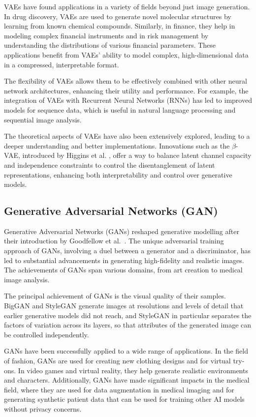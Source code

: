 VAEs have found applications in a variety of fields beyond just image generation. In drug discovery,
VAEs are used to generate novel molecular structures by learning from known chemical compounds.
Similarly, in finance, they help in modeling complex financial instruments and in risk management by
understanding the distributions of various financial parameters. These applications benefit from
VAEs' ability to model complex, high-dimensional data in a compressed, interpretable format.

The flexibility of VAEs allows them to be effectively combined with other neural network
architectures, enhancing their utility and performance. For example, the integration of VAEs with
Recurrent Neural Networks (RNNs) has led to improved models for sequence data, which is useful in
natural language processing and sequential image analysis.

The theoretical aspects of VAEs have also been extensively explored, leading to a deeper
understanding and better implementations. Innovations such as the $\beta$-VAE, introduced by Higgins
et al. \parencite{higgins2017betavae}, offer a way to balance latent channel capacity and
independence constraints to control the disentanglement of latent representations, enhancing both
interpretability and control over generative models.

\subsection{Generative Adversarial Networks (GAN)}

Generative Adversarial Networks (GANs) reshaped generative modelling after their introduction by
Goodfellow et al.\ \parencite{arXiv:1406.2661}. The unique adversarial training approach of GANs,
involving a duel between a generator and a discriminator, has led to substantial advancements in
generating high-fidelity and realistic images. The achievements of GANs span various domains, from
art creation to medical image analysis.

The principal achievement of GANs is the visual quality of their samples. BigGAN
\parencite{arXiv:1809.11096} and StyleGAN \parencite{arXiv:1812.04948} generate images at
resolutions and levels of detail that earlier generative models did not reach, and StyleGAN in
particular separates the factors of variation across its layers, so that attributes of the generated
image can be controlled independently.

GANs have been successfully applied to a wide range of applications. In the field of fashion, GANs
are used for creating new clothing designs and for virtual try-ons. In video games and virtual
reality, they help generate realistic environments and characters. Additionally, GANs have made
significant impacts in the medical field, where they are used for data augmentation in medical
imaging and for generating synthetic patient data that can be used for training other AI models
without privacy concerns.

